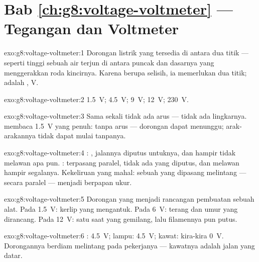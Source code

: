 \section*{Bab \ref{ch:g8:voltage-voltmeter} --- Tegangan dan Voltmeter}

\begin{solution}{exo:g8:voltage-voltmeter:1}
Dorongan listrik yang tersedia di antara dua titik --- seperti tinggi
sebuah air terjun di antara puncak dan dasarnya yang menggerakkan roda
kincirnya. Karena berupa selisih, ia memerlukan dua titik; 
adalah , \unit{V}.
\end{solution}

\begin{solution}{exo:g8:voltage-voltmeter:2}
\qty{1.5}{V}; \qty{4.5}{V}; \qty{9}{V}; \qty{12}{V};
\qty{230}{V}.
\end{solution}

\begin{solution}{exo:g8:voltage-voltmeter:3}
Sama sekali tidak ada arus --- tidak ada lingkarnya. 
membaca \qty{1.5}{V} yang penuh:  tanpa arus --- dorongan
dapat menunggu; arak-arakannya tidak dapat mulai tanpanya.
\end{solution}

\begin{solution}{exo:g8:voltage-voltmeter:4}
: , jalannya diputus untuknya, dan hampir
tidak melawan apa pun. : terpasang paralel, tidak ada yang
diputus, dan melawan hampir segalanya. Kekeliruan yang mahal: sebuah
 yang dipasang melintang --- secara paralel --- menjadi
 berpapan ukur.
\end{solution}

\begin{solution}{exo:g8:voltage-voltmeter:5}
Dorongan yang menjadi rancangan pembuatan sebuah alat. Pada
\qty{1.5}{V}: kerlip yang mengantuk. Pada \qty{6}{V}: terang dan umur
yang dirancang. Pada \qty{12}{V}: satu saat yang gemilang, lalu
filamennya pun putus.
\end{solution}

\begin{solution}{exo:g8:voltage-voltmeter:6}
: \qty{4.5}{V}; lampu: \qty{4.5}{V}; kawat: kira-kira
\qty{0}{V}. Dorongannya berdiam melintang pada pekerjanya --- kawatnya
adalah jalan yang datar.
\end{solution}

